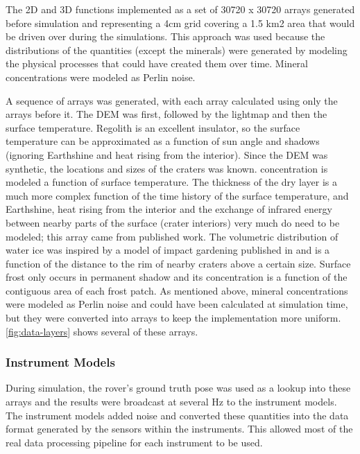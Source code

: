 \documentclass[twocolumn,letterpaper]{IEEEAerospaceCLS}  %
\begin{document}
The 2D and 3D functions implemented as a set of 30720 x 30720 arrays generated before simulation and representing a 4cm grid covering a 1.5 km2 area that would be driven over during the simulations.  
This approach was used because the distributions of the quantities (except the minerals) were generated by modeling the physical processes that could have created them over time.  
Mineral concentrations were modeled as Perlin noise.

A sequence of arrays was generated, with each array calculated using only the arrays before it.  
The DEM was first, followed by the lightmap and then the surface temperature.  
Regolith is an excellent insulator, so the surface temperature can be approximated as a function of sun angle and shadows (ignoring Earthshine and heat rising from the interior).  
Since the DEM was synthetic, the locations and sizes of the craters was known.  
 concentration is modeled a function of surface temperature.  
The thickness of the dry layer is a much more complex function of the time history of the surface temperature, and Earthshine, heat rising from the interior and the exchange of infrared energy between nearby parts of the surface (crater interiors) very much do need to be modeled; this array came from published work\cite{siegler2015}.  
The volumetric distribution of water ice was inspired by a model of impact gardening published in \cite{hurley2012} and is a function of the distance to the rim of nearby craters above a certain size.  
Surface frost only occurs in permanent shadow and its concentration is a function of the contiguous area of each frost patch.  
As mentioned above, mineral concentrations were modeled as Perlin noise and could have been calculated at simulation time, but they were converted into arrays to keep the implementation more uniform.  
\cref{fig:data-layers} shows several of these arrays.

\subsubsection{Instrument Models}
During simulation, the rover's ground truth pose was used as a lookup into these arrays and the results were broadcast at several Hz to the instrument models.  
The instrument models added noise and converted these quantities into the data format generated by the sensors within the instruments.  
This allowed most of the real data processing pipeline for each instrument to be used.
\end{document}
